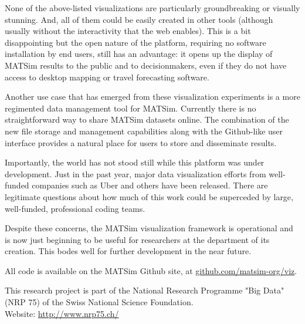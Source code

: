 \documentclass[Afour,sagev,times]{sagej}
\begin{document}
None of the above-listed visualizations are particularly groundbreaking or visually stunning. And, all of them could be easily created in other tools (although usually without the interactivity that the web enables). This is a bit disappointing but the open nature of the platform, requiring no software installation by end users, still has an advantage: it opens up the display of MATSim results to the public and to decisionmakers, even if they do not have access to desktop mapping or travel forecasting software.

Another use case that has emerged from these visualization experiments is a more regimented data management tool for MATSim. Currently there is no straightforward way to share MATSim datasets online. The combination of the new file storage and management capabilities along with the Github-like user interface provides a natural place for users to store and disseminate results.

Importantly, the world has not stood still while this platform was under development. Just in the past year, major data visualization efforts from well-funded companies such as Uber and others have been released. There are legitimate questions about how much of this work could be superceded by large, well-funded, professional coding teams.

Despite these concerns, the MATSim visualization framework is operational and is now just beginning to be useful for researchers at the department of its creation. This bodes well for further development in the near future.

All code is available on the MATSim Github site, at \url{github.com/matsim-org/viz}.


\begin{acks}
This research project is part of the National Research Programme "Big Data" (NRP 75) of the Swiss National Science Foundation.\\
Website: \url{http://www.nrp75.ch/}
\end{acks}
\end{document}
